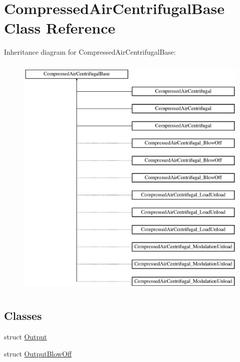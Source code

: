 \hypertarget{class_compressed_air_centrifugal_base}{}\section{Compressed\+Air\+Centrifugal\+Base Class Reference}
\label{class_compressed_air_centrifugal_base}
Inheritance diagram for Compressed\+Air\+Centrifugal\+Base\+:\begin{figure}[H]
\begin{center}
\leavevmode
\includegraphics[height=12.000000cm]{d2/de4/class_compressed_air_centrifugal_base}
\end{center}
\end{figure}
\subsection*{Classes}
\begin{DoxyCompactItemize}
\item 
struct \hyperlink{struct_compressed_air_centrifugal_base_1_1_output}{Output}
\item 
struct \hyperlink{struct_compressed_air_centrifugal_base_1_1_output_blow_off}{Output\+Blow\+Off}
\end{DoxyCompactItemize}

